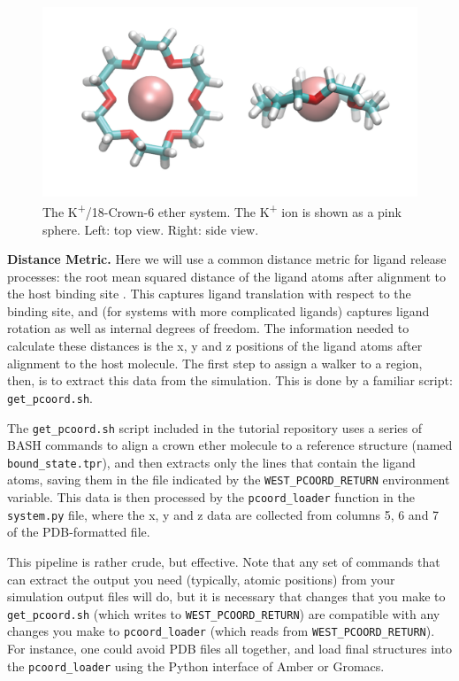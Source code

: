 \documentclass[9pt,tutorial,ASAPversion]{livecoms}
\begin{document}
\begin{figure}
\includegraphics[width=\linewidth]{Figure12.png}
\caption{The K\textsuperscript{+}/18-Crown-6 ether system. 
The K\textsuperscript{+} ion is shown as a pink sphere. Left: top view. Right: side view.}
\label{fig:view}
\end{figure}

\textbf{Distance Metric.} Here we will use a common distance metric for ligand release processes: the root mean squared distance of the ligand atoms after alignment to the host binding site \citep{Dickson2017,Dixon2018,Dickson2018}.
This captures ligand translation with respect to the binding site, and (for systems with more complicated ligands) captures ligand rotation as well as internal degrees of freedom. 
The information needed to calculate these distances is the x, y and z positions of the ligand atoms after alignment to the host molecule. 
The first step to assign a walker to a region, then, is to extract this data from the simulation. 
This is done by a familiar script: \verb|get_pcoord.sh|.

The \verb|get_pcoord.sh| script included in the tutorial repository uses a series of BASH commands to align a crown ether molecule to a reference structure (named \verb|bound_state.tpr|), and then extracts only the lines that contain the ligand atoms, saving them in the file indicated by the \verb|WEST_PCOORD_RETURN| environment variable. 
This data is then processed by the \verb|pcoord_loader| function in the \verb|system.py| file, where the x, y and z data are collected from columns 5, 6 and 7 of the PDB-formatted file. 

This pipeline is rather crude, but effective. 
Note that any set of commands that can extract the output you need (typically, atomic positions) from your simulation output files will do, but it is necessary that changes that you make to \verb|get_pcoord.sh| (which writes to \verb|WEST_PCOORD_RETURN|) are compatible with any changes you make to \verb|pcoord_loader| (which reads from \verb|WEST_PCOORD_RETURN|). 
For instance, one could avoid PDB files all together, and load final structures into the \verb|pcoord_loader| using the Python interface of Amber or Gromacs.
\end{document}
